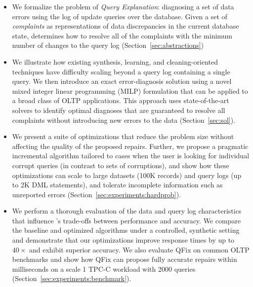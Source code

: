 \begin{itemize}[leftmargin=*, topsep=0mm, itemsep=0mm]

\item We formalize the problem of \emph{Query Explanation}: diagnosing a set of data errors using the log of update queries over the database.  Given a set of \emph{complaints} as representations of data discrepancies in the current database state, \sys determines how to resolve all of the complaints with the minimum number of changes to the query log (Section~\ref{sec:abstractions})

\item We illustrate how existing synthesis, learning, and cleaning-oriented techniques have difficulty scaling beyond a query log containing a single query.   We then introduce an exact error-diagnosis solution using a novel mixed integer linear programming (MILP) formulation that can be applied to a broad class of OLTP applications.  This approach uses state-of-the-art solvers to identify optimal diagnoses that are guaranteed to resolve all complaints without introducing new errors to the data (Section~\ref{sec:sol}).

\item We present a suite of optimizations that reduce the problem size without affecting the quality of the proposed repairs.  Further, we propose a pragmatic incremental algorithm tailored to cases when the user is looking for individual corrupt queries (in contrast to sets of corruptions), and show how these optimizations can scale to large datasets (100K records) and query logs (up to 2K DML statements), and tolerate incomplete information such as unreported errors (Section~\ref{sec:experiments:hardprob}).

\item We perform a thorough evaluation of the data and query log characteristics that influence \sys's trade-offs between performance and accuracy.  We compare the baseline and optimized algorithms under a controlled, synthetic setting and demonstrate that our optimizations improve response times by up to $40\times$ and exhibit superior accuracy.   We also evaluate QFix on common OLTP benchmarks and show how QFix can propose fully accurate repairs within milliseconds on a scale 1 TPC-C workload with 2000 queries (Section~\ref{sec:experiments:benchmark}).

\end{itemize}
